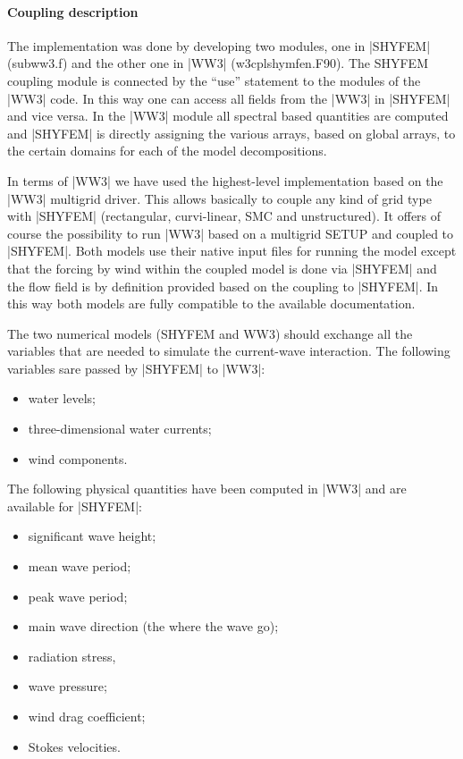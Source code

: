 \paragraph{Coupling description}
The implementation was done by developing two modules, one in
|SHYFEM| (subww3.f) and the other one in |WW3| (w3cplshymfen.F90). The 
SHYFEM coupling module is connected by the ``use'' statement to the 
modules of the |WW3| code. In this way one can access all fields from 
the |WW3| in |SHYFEM| and vice versa. In the |WW3| module all spectral based
quantities are computed and |SHYFEM| is directly assigning the various 
arrays, based on global arrays, to the certain domains for each of the 
model decompositions.

In terms of |WW3| we have used the highest-level implementation based
on the |WW3| multigrid driver. This allows basically to couple any kind
of grid type with |SHYFEM| (rectangular, curvi-linear, SMC and
unstructured). It offers of course the possibility to run |WW3| based
on a multigrid SETUP and coupled to |SHYFEM|. Both models use their
native input files for running the model except that the forcing by
wind within the coupled model is done via |SHYFEM| and the flow field
is by definition provided based on the coupling to |SHYFEM|. In this
way both models are fully compatible to the available documentation.

The two numerical models (SHYFEM and WW3) should exchange all the
variables that are needed to simulate the current-wave interaction.
The following variables sare passed by |SHYFEM| to |WW3|:
\begin{itemize}
\item water levels;
\item three-dimensional water currents;
\item wind components.
\end{itemize}

The following physical quantities have been computed in |WW3| and are 
available for |SHYFEM|:
\begin{itemize}
\item significant wave height;
\item mean wave period;
\item peak wave period;
\item main wave direction (the where the wave go);
\item radiation stress,
\item wave pressure;
\item wind drag coefficient;
\item Stokes velocities.
\end{itemize}

